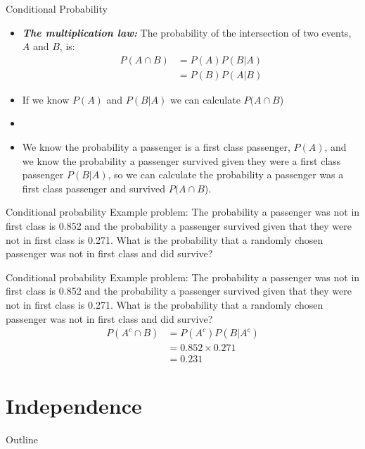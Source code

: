 \documentclass[xcolor=dvipsnames]{beamer}
\begin{document}
\begin{frame}{Conditional Probability}
	\begin{itemize}
		\item \textbf{\emph{The multiplication law:}} The probability of the intersection of two events, $A$ and $B$, is:
		\begin{align*}
		P(A \cap B) &= P(A) P(B|A) \\
		&= P(B)P(A|B)
		\end{align*}\pause
		\item If we know $P(A)$ and $P(B|A)$ we can calculate $P(A \cap B$) \pause
		\item[]
		\item We know the probability a passenger is a first class passenger, $P(A)$, and we know the probability a passenger survived given they were a first class passenger $P(B|A)$, so we can calculate the probability a passenger was a first class passenger and survived $P(A \cap B$).
	\end{itemize}
\end{frame}

\begin{frame}{Conditional probability}
Example problem: The probability a passenger was not in first class is 0.852 and the probability a passenger survived given that they were not in first class is 0.271. What is the probability that a randomly chosen passenger was not in first class and did survive?
\end{frame}

\begin{frame}{Conditional probability}
	Example problem: The probability a passenger was not in first class is 0.852 and the probability a passenger survived given that they were not in first class is 0.271. What is the probability that a randomly chosen passenger was not in first class and did survive?
	\begin{align*}
		P(A^c \cap B) &= P(A^c) P(B|A^c) \\
		&= 0.852 \times 0.271 \\
		&= 0.231
	\end{align*}
\end{frame}

\section{Independence}
\begin{frame}{Outline}
\tableofcontents[currentsection,subsectionstyle=show/shaded/hide]
\end{frame}
\end{document}
